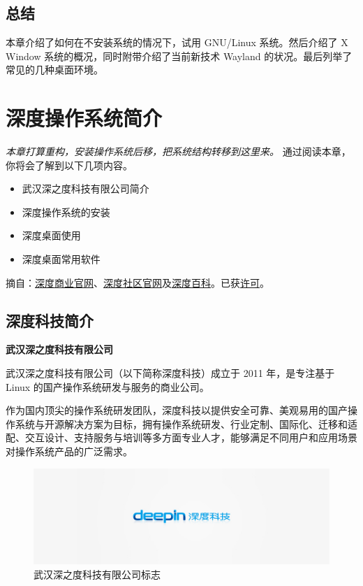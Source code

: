 \documentclass[doctor,openright,twoside]{sjtuthesis}
\providecommand{\tightlist}{%
    \setlength{\itemsep}{0pt}\setlength{\parskip}{0pt}}
\theoremstyle{plain}
\theoremstyle{definition}
\theoremstyle{remark}
\theoremstyle{ocrenumbox}
\theoremstyle{plain}
\begin{document}
\hypertarget{section-13}{%
\section{总结}\label{section-13}}

本章介绍了如何在不安装系统的情况下，试用 GNU/Linux 系统。然后介绍了 X Window 系统的概况，同时附带介绍了当前新技术 Wayland 的状况。最后列举了常见的几种桌面环境。

\hypertarget{chap:deepin-intro}{%
\chapter{\texorpdfstring{深度操作系统简介}{深度操作系统简介}}\label{chap:deepin-intro}}

\emph{本章打算重构，安装操作系统后移，把系统结构转移到这里来。}
通过阅读本章，你将会了解到以下几项内容。

\begin{itemize}
\tightlist
\item
  武汉深之度科技有限公司简介
\item
  深度操作系统的安装
\item
  深度桌面使用
\item
  深度桌面常用软件
\end{itemize}

摘自：\href{https://www.deepin.com/}{深度商业官网}、\href{https://www.deepin.org/}{深度社区官网}及\href{http://wiki.deepin.org/wiki/DEEPIN_\%E6\%A1\%8C\%E9\%9D\%A2\%E7\%B3\%BB\%E7\%BB\%9F\%E5\%AE\%89\%E8\%A3\%85\%E6\%A6\%82\%E8\%BF\%B0}{深度百科}。已获\href{https://bbs.deepin.org/forum.php?mod=viewthread\&tid=39632\&page=10\#pid377474}{许可}。

\hypertarget{section-14}{%
\section{\texorpdfstring{深度科技简介}{深度科技简介}}\label{section-14}}

\textbf{武汉深之度科技有限公司}

武汉深之度科技有限公司（以下简称深度科技）成立于 2011 年，是专注基于 Linux 的国产操作系统研发与服务的商业公司。

作为国内顶尖的操作系统研发团队，深度科技以提供安全可靠、美观易用的国产操作系统与开源解决方案为目标，拥有操作系统研发、行业定制、国际化、迁移和适配、交互设计、支持服务与培训等多方面专业人才，能够满足不同用户和应用场景对操作系统产品的广泛需求。

\begin{figure}
\includegraphics{about-us_content_logo} \caption[武汉深之度科技有限公司标志]{武汉深之度科技有限公司标志}\label{fig:deepin-inc}
\end{figure}
\end{document}
